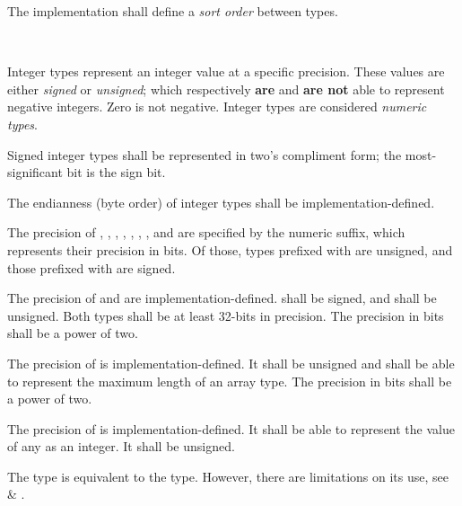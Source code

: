 \specsubitem
The implementation shall define a \textit{sort order} between types.


\begin{grammar}
\oneof \\
\end{grammar}

\specsubsubitem
Integer types represent an integer value at a specific precision. These values
are either \textit{signed} or \textit{unsigned}; which respectively
\textbf{are} and \textbf{are not} able to represent negative integers. Zero is
not negative. Integer types are considered \textit{numeric types}.

\specsubsubitem
Signed integer types shall be represented in two's compliment form; the
most-significant bit is the sign bit.

\specsubsubitem
The endianness (byte order) of integer types shall be implementation-defined.

\specsubsubitem
The precision of , , ,
, , , , and
 are specified by the numeric suffix, which represents their
precision in bits. Of those, types prefixed with  are unsigned, and
those prefixed with  are signed.

\specsubsubitem
The precision of  and  are
implementation-defined.  shall be signed, and
 shall be unsigned. Both types shall be at least 32-bits in
precision. The precision in bits shall be a power of two.

\specsubsubitem
The precision of  is implementation-defined. It shall be
unsigned and shall be able to represent the maximum length of an array type.
The precision in bits shall be a power of two.

\specsubsubitem
The precision of  is implementation-defined. It shall be
able to represent the value of any  as an integer.
It shall be unsigned.

\specsubsubitem
The  type is equivalent to the  type. However, there
are limitations on its use, see 
\& .

